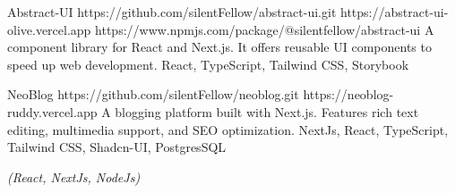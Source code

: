 \documentclass[10pt,a4paper,ragged2e,withhyper]{altacv}
\begin{document}
\begin{paracol}{2}
\divider

\cvproject
  {Abstract-UI}
  {https://github.com/silentFellow/abstract-ui.git}
  {https://abstract-ui-olive.vercel.app}
  {https://www.npmjs.com/package/@silentfellow/abstract-ui}
  {A component library for React and Next.js. It offers reusable UI components to speed up web development.}
  {React, TypeScript, Tailwind CSS, Storybook}

\divider

\cvproject
  {NeoBlog}
  {https://github.com/silentFellow/neoblog.git}
  {https://neoblog-ruddy.vercel.app}
  {}
  {A blogging platform built with Next.js. Features rich text editing, multimedia support, and SEO optimization.}
  {NextJs, React, TypeScript, Tailwind CSS, Shadcn-UI, PostgresSQL}

\medskip



\switchcolumn


{\LaTeXraggedright
{}
\par}


\divider

\textit{(React, NextJs, NodeJs)}
\divider

\divider

\divider


{\LaTeXraggedright
{}
\par}

\medskip



\divider



\end{paracol}
\end{document}
